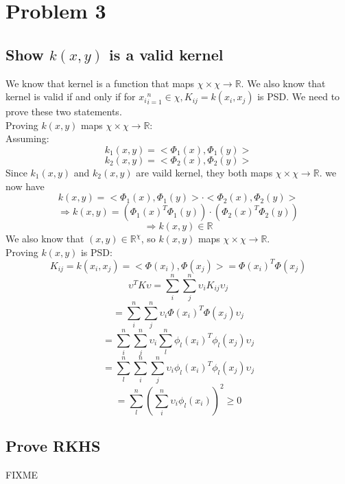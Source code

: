 \documentclass[twoside]{article}
\theoremstyle{definition}
\theoremstyle{definition}
\theoremstyle{remark}
\def\R{{\mathbb R}}
\begin{document}
\section{Problem 3}
\subsection{Show $k(x,y)$ is a valid kernel}
We know that kernel is a function that maps $\chi \times \chi \rightarrow \R$. 
We also know that kernel is valid if and only if for ${x_i}_{i=1}^n \in \chi, K_{ij} = k(x_i,x_j)$ is PSD. We need to prove these two statements.\\ 
Proving $k(x,y)$ maps $\chi \times \chi \rightarrow \R$:\\ 
Assuming:
\[k_1(x,y) = <\Phi_1(x),\Phi_1(y)>\]
\[k_2(x,y) = <\Phi_2(x),\Phi_2(y)>\]
Since $k_1(x,y)$ and $k_2(x,y)$ are vaild kernel, they both maps $\chi \times \chi \rightarrow \R$. 
we now have 
\[k(x,y) = <\Phi_1(x),\Phi_1(y)>\cdot <\Phi_2(x),\Phi_2(y)>\]
\[\Rightarrow k(x,y) = (\Phi_1(x)^T \Phi_1(y))\cdot(\Phi_2(x)^T\Phi_2(y))\]
\[\Rightarrow k(x,y) \in \R\]
We also know that $(x,y) \in \R^\chi$, so $k(x,y)$ maps $\chi \times \chi \rightarrow \R$.\\
Proving $k(x,y)$ is PSD:
\[K_{ij} = k(x_i,x_j) =  <\Phi(x_i),\Phi(x_j)> =\Phi(x_i)^T\Phi(x_j) \]
\[\upsilon^T K \upsilon = \sum_i^n \sum_j^n \upsilon_i K_{ij} \upsilon_j\]
\[=\sum_i^n \sum_j^n \upsilon_i \Phi(x_i)^T\Phi(x_j) \upsilon_j\]
\[=\sum_i^n \sum_j^n \upsilon_i \sum_l^n \phi_l(x_i)^T\phi_l(x_j) \upsilon_j\]
\[=\sum_l^n \sum_i^n \sum_j^n \upsilon_i \phi_l(x_i)^T\phi_l(x_j) \upsilon_j\]
\[=\sum_l^n(\sum_i^n \upsilon_i \phi_l(x_i))^2 \geq 0\]
\subsection{Prove RKHS}
FIXME
\end{document}
